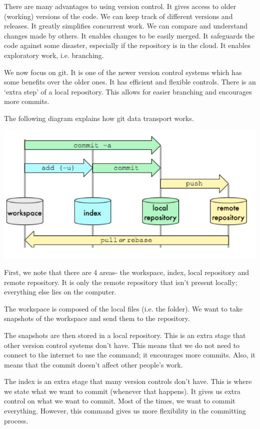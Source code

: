 \documentclass[a4paper, openany]{memoir}
\begin{document}
    \noindent There are many advantages to using version control. It gives access to older (working) versions of the code. We can keep track of different versions and releases. It greatly simplifies concurrent work. We can compare and understand changes made by others. It enables changes to be easily merged. It safeguards the code against some disaster, especially if the repository is in the cloud. It enables exploratory work, i.e. branching.

    \noindent We now focus on git. It is one of the newer version control systems which has some benefits over the older ones. It has efficient and flexible controls. There is an `extra step' of a local repository. This allows for easier branching and encourages more commits.

    \noindent The following diagram explains how git data transport works.
    \begin{center}
        \includegraphics[scale=0.6]{src/L2I1.png}
    \end{center}
    First, we note that there are 4 areas- the workspace, index, local repository and remote repository. It is only the remote repository that isn't present locally; everything else lies on the computer. 

    \noindent The workspace is composed of the local files (i.e. the folder). We want to take snapshots of the workspace and send them to the repository. 

    \noindent The snapshots are then stored in a local repository. This is an extra stage that other version control systems don't have. This means that we do not need to connect to the internet to use the command; it encourages more commits. Also, it means that the commit doesn't affect other people's work.

    \noindent The index is an extra stage that many version controls don't have. This is where we state what we want to commit (whenever that happens). It gives us extra control on what we want to commit. Most of the times, we want to commit everything. However, this command gives us more flexibility in the committing process.
\end{document}
